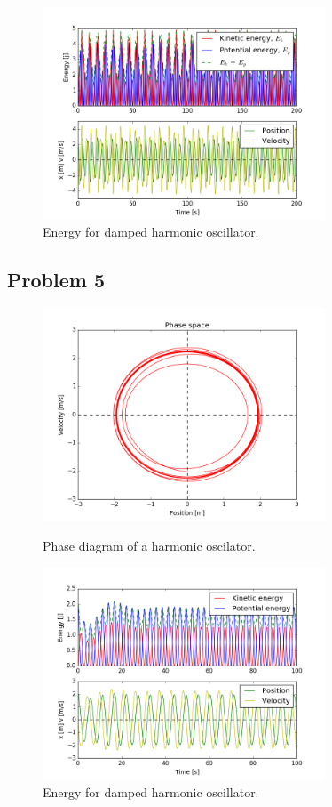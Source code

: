 \documentclass{article}
\begin{document}
\begin{figure}[H]
\centering
\includegraphics[width=0.75\textwidth]{problem_4_2_2}
\caption{Energy for damped harmonic oscillator.}
\label{fig:problem_b_contour_fig}
\end{figure}



\subsection*{Problem 5}
\begin{figure}[H]
\centering
\includegraphics[width=0.75\textwidth]{problem_5_1}\label{figure_1}
\caption{Phase diagram of a harmonic oscilator.}
\label{fig:problem_b_contour_fig}
\end{figure}
\begin{figure}[H]
\centering
\includegraphics[width=0.75\textwidth]{problem_5_2}
\caption{Energy for damped harmonic oscillator.}
\label{fig:problem_b_contour_fig}
\end{figure}
\end{document}
